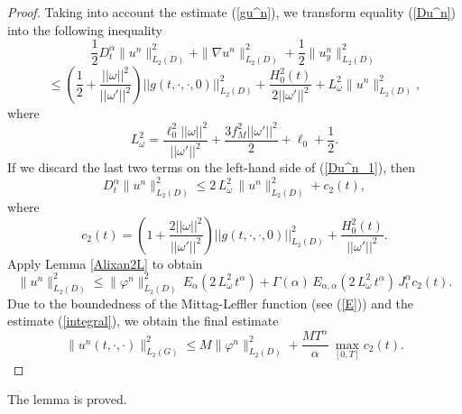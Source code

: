 \documentclass[12pt]{amsart}
\theoremstyle{definition}
\numberwithin{equation}{section}
\begin{document}
\begin{proof}
Taking into account the estimate (\ref{gu^n}), we transform equality (\ref{Du^n}) into the following inequality
\begin{equation}\label{Du^n_1}
\frac{1}{2} D_t^\alpha \| u^n \|_{L_2(D)}^2 + \| \nabla u^n \|_{L_2(D)}^2 +  \frac{1}{2} \| u^n_y \|_{L_2(D)}^2
\end{equation}
\[
\leq \left(\frac{1}{2} +  \frac{||\omega||^2}{||\omega'||^2}\right) ||g(t, \cdot, \cdot, 0)||_{L_2(D)}^2 + \frac{H_0^2(t)}{2 ||\omega'||^2} + L_\omega^2 \| u^n \|_{L_2(D)}^2,
\]
where
\[
L_\omega^2 = \frac{\ell_0^2 ||\omega||^2}{||\omega'||^2} + \frac{3 f_M^2 ||\omega'||^2}{2} + \ell_0 + \frac{1}{2}.
\]
If we discard the last two terms on the left-hand side of (\ref{Du^n_1}), then
\[
D_t^\alpha \| u^n \|_{L_2(D)}^2 \leq 2\,L_\omega^2\,\| u^n \|_{L_2(D)}^2 +c_2(t),
\]
where
\[
c_2(t) = \left(1 +  \frac{2||\omega||^2}{||\omega'||^2}\right) ||g(t, \cdot, \cdot, 0)||_{L_2(D)}^2 + \frac{H_0^2(t)}{ ||\omega'||^2}.
\]
Apply Lemma \ref{Alixan2L} to obtain
\[
\| u^n \|_{L_2(D)}^2\leq \| \varphi^n \|_{L_2(D)}^2 \,E_\alpha(2\,L_\omega^2\, t^\alpha) + \Gamma(\alpha) \,E_{\alpha, \alpha}(2\,L_\omega^2\, t^\alpha) \, J_t^\alpha c_2(t).
\]
Due to the boundedness  of the Mittag-Leffler function (see (\ref{E})) and the estimate (\ref{integral}), we obtain the final estimate
\begin{equation}\label{un_final}
    \| u^n(t, \cdot, \cdot) \|_{L_2(G)}^2\leq M\| \varphi^n \|_{L_2(D)}^2  + \frac{MT^\alpha}{\alpha} \,\max_{[0,T]}c_{2}(t) .
\end{equation}
\end{proof}
The lemma is proved.
\end{document}
